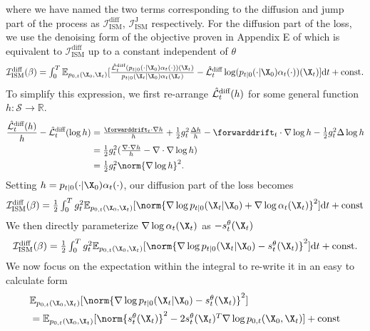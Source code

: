 where we have named the two terms corresponding to the diffusion and jump part of the process as $\mathcal{I}_{\text{ISM}}^{\text{diff}}$, $\mathcal{I}_{\text{ISM}}^{\text{J}}$ respectively. For the diffusion part of the loss, we use the denoising form of the objective proven in Appendix E of \cite{benton2022denoising} which is equivalent to $\mathcal{I}_{\text{ISM}}^{\text{diff}}$ up to a constant independent of $\theta$
\begin{equation}
  \textstyle 
    \mathcal{I}_{\text{ISM}}^{\text{diff}}(\beta) = \int_{0}^T \mathbb{E}_{p_{0, t}(\X_0, \X_t)} [ \frac{\Ldiff_t ( p_{t|0}( \cdot | \X_0) \alpha_t(\cdot))(\X_t)}{p_{t|0}(\X_t | \X_0) \alpha_t(\X_t) } - \Ldiff_t \log ( p_{t|0}(\cdot | \X_0) \alpha_t(\cdot) ) (\X_t) ] \rmd t + \text{const} .
\end{equation}
To simplify this expression, we first re-arrange $\hat{\mathcal{L}}^{\text{diff}}_t(h)$ for some general function $h : \mathcal{S} \rightarrow \mathbb{R}$.
\begin{align}
    \frac{\Ldiff_t(h)}{h} - \Ldiff_t(\log h) &\textstyle  = \frac{\forwarddrift_t \cdot \nabla h}{h} + \frac{1}{2} g_t^2 \frac{\Delta h}{h} - \forwarddrift_t \cdot \nabla \log h - \frac{1}{2} g_t^2 \Delta \log h \\
    &\textstyle = \frac{1}{2} g_t^2 ( \frac{\nabla \cdot \nabla h}{h} - \nabla \cdot \nabla \log h ) \\
    &\textstyle = \frac{1}{2} g_t^2 \norm{\nabla \log h}^2 . 
\end{align}
Setting $h = p_{t|0}(\cdot | \X_0) \alpha_t(\cdot)$, our diffusion part of the loss becomes
\begin{equation}
  \textstyle 
    \mathcal{I}_{\text{ISM}}^{\text{diff}}(\beta) = \frac{1}{2} \int_{0}^T g_t^2 \mathbb{E}_{p_{0, t}(\X_0, \X_t) } [ \norm{ \nabla \log p_{t|0}(\X_t | \X_0) + \nabla \log \alpha_t(\X_t) }^2 ] \rmd t + \text{const}
\end{equation}
We then directly parameterize $\nabla \log \alpha_t(\X_t)$ as $- s_t^\theta(\X_t)$
\begin{equation}
  \textstyle 
    \mathcal{I}_{\text{ISM}}^{\text{diff}}(\beta) = \frac{1}{2} \int_{0}^T g_t^2 \mathbb{E}_{p_{0, t}(\X_0, \X_t) } [ \norm{ \nabla \log p_{t|0}(\X_t | \X_0) - s_t^\theta(\X_t) }^2 ] \rmd t + \text{const} .
\end{equation}
We now focus on the expectation within the integral to re-write it in an easy to calculate form
\begin{align}
    &\textstyle \mathbb{E}_{p_{0, t}(\X_0, \X_t) } [ \norm{ \nabla \log p_{t|0}(\X_t | \X_0) - s_t^\theta(\X_t) }^2 ] \\
    &\textstyle = \mathbb{E}_{p_{0,t}(\X_0, \X_t)} [ \norm{s_t^\theta(\X_t)}^2 - 2 s_t^\theta(\X_t)^T \nabla \log p_{0,t}(\X_0, \X_t) ] + \text{const}
\end{align}
